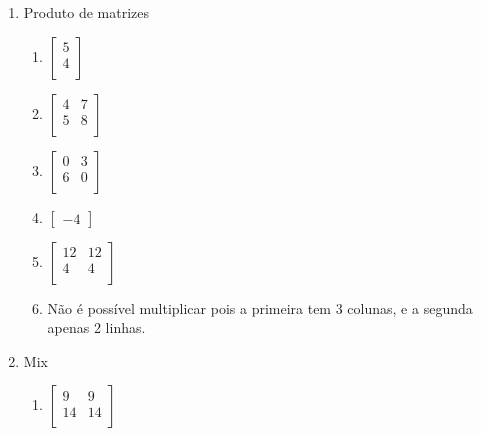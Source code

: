 \documentclass[a4paper]{article}
\begin{document}
\begin{multicols}{2}
\begin{enumerate}
\begin{enumerate}
    \end{enumerate}

  \item Produto de matrizes

    \begin{enumerate}
    \item 
      $
      \begin{bmatrix}
        5\\
        4\\
      \end{bmatrix}
      $

    \item 
      $
      \begin{bmatrix}
        4 & 7\\
        5 & 8\\
      \end{bmatrix}
      $

    \item 
      $
      \begin{bmatrix}
        0 & 3\\
        6 & 0\\
      \end{bmatrix}
      $

    \item 
      $
      \begin{bmatrix}
        -4
      \end{bmatrix}
      $
      
    \item 
      $
      \begin{bmatrix}
        12 & 12\\
        4 & 4\\
      \end{bmatrix}
      $

    \item Não é possível multiplicar pois a primeira tem 3 colunas, e
      a segunda apenas 2 linhas.

    \end{enumerate}

    
  \item Mix

    \begin{enumerate}
    \item 
      $
      \begin{bmatrix}
        9 & 9\\
        14 & 14\\
      \end{bmatrix}
      $


\end{enumerate}
\end{enumerate}
\end{multicols}
\end{document}
